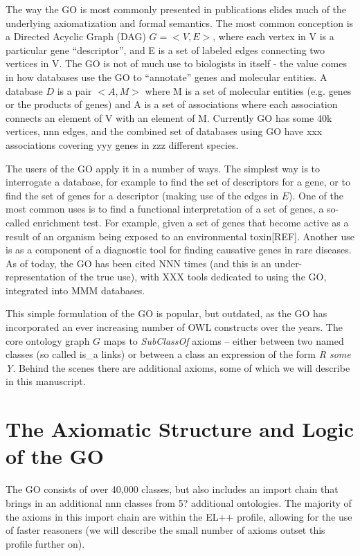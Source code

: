 \documentclass{llncs}
\begin{document}
The way the GO is most commonly presented in publications elides much
of the underlying axiomatization and formal semantics. The most common
conception is a Directed Acyclic Graph (DAG) $G = <V,E>$, where each
vertex in V is a particular gene ``descriptor'', and E is a set of
labeled edges connecting two vertices in V. The GO is not of much use
to biologists in itself - the value comes in how databases use the GO
to ``annotate'' genes and molecular entities.  A database $D$ is a
pair $<A, M>$ where M is a set of molecular entities (e.g. genes or
the products of genes) and A is a set of associations where each
association connects an element of V with an element of M. Currently
GO has some 40k vertices, nnn edges, and the combined set of databases
using GO have xxx associations covering yyy genes in zzz different
species\cite{Blake2013}.

The users of the GO apply it in a number of ways. The simplest way is
to interrogate a database, for example to find the set of descriptors
for a gene, or to find the set of genes for a descriptor (making use
of the edges in $E$). One of the most common uses is to find a
functional interpretation of a set of genes, a so-called enrichment
test. For example, given a set of genes that become active as a result
of an organism being exposed to an environmental toxin[REF]. Another
use is as a component of a diagnostic tool for finding causative genes
in rare diseases\cite{Phevor}. As of today, the GO has been cited NNN
times (and this is an under-representation of the true use), with XXX
tools dedicated to using the GO, integrated into MMM databases.

This simple formulation of the GO is popular, but outdated, as the GO
has incorporated an ever increasing number of OWL constructs over the
years. The core ontology graph $G$ maps to \emph{SubClassOf} axioms --
either between two named classes (so called is\_a links) or between a
class an expression of the form \emph{R some Y}. Behind the scenes
there are additional axioms, some of which we will describe in this
manuscript.

\section{The Axiomatic Structure and Logic of the GO}

The GO consists of over 40,000 classes, but also includes an import
chain that brings in an additional nnn classes from 5? additional
ontologies. The majority of the axioms in this import chain are within
the EL++ profile, allowing for the use of faster reasoners (we will
describe the small number of axioms outset this profile further on).
\end{document}
